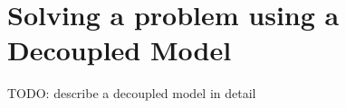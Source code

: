 \section[Decoupled model]{Solving a problem using a Decoupled Model}\label{tutorial-decoupled}

TODO: describe a decoupled model in detail